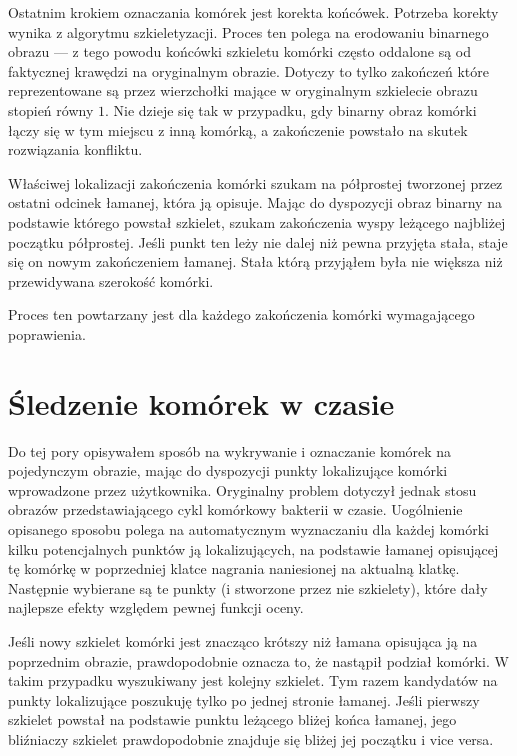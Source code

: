 \documentclass[declaration,shortabstract,mgr]{iithesis}
\begin{document}
Ostatnim krokiem oznaczania komórek jest korekta końcówek.
Potrzeba korekty wynika z algorytmu szkieletyzacji.
Proces ten polega na erodowaniu binarnego obrazu --- z tego powodu końcówki szkieletu komórki często oddalone są od faktycznej krawędzi na oryginalnym obrazie.
Dotyczy to tylko zakończeń które reprezentowane są przez wierzchołki mające w oryginalnym szkielecie obrazu stopień równy $1$.
Nie dzieje się tak w przypadku, gdy binarny obraz komórki łączy się w tym miejscu z inną komórką, a zakończenie powstało na skutek rozwiązania konfliktu.

Właściwej lokalizacji zakończenia komórki szukam na półprostej tworzonej przez ostatni odcinek łamanej, która ją opisuje.
Mając do dyspozycji obraz binarny na podstawie którego powstał szkielet, szukam zakończenia wyspy leżącego najbliżej początku półprostej.
Jeśli punkt ten leży nie dalej niż pewna przyjęta stała, staje się on nowym zakończeniem łamanej.
Stała którą przyjąłem była nie większa niż przewidywana szerokość komórki.

Proces ten powtarzany jest dla każdego zakończenia komórki wymagającego poprawienia.

\section{Śledzenie komórek w czasie}
\label{sec:cell-tracking}

Do tej pory opisywałem sposób na wykrywanie i oznaczanie komórek na pojedynczym obrazie, mając do dyspozycji punkty lokalizujące komórki wprowadzone przez użytkownika.
Oryginalny problem dotyczył jednak stosu obrazów przedstawiającego cykl komórkowy bakterii w czasie.
Uogólnienie opisanego sposobu polega na automatycznym wyznaczaniu dla każdej komórki kilku potencjalnych punktów ją lokalizujących, na podstawie łamanej opisującej tę komórkę w poprzedniej klatce nagrania naniesionej na aktualną klatkę.
Następnie wybierane są te punkty (i stworzone przez nie szkielety), które dały najlepsze efekty względem pewnej funkcji oceny.

Jeśli nowy szkielet komórki jest znacząco krótszy niż łamana opisująca ją na poprzednim obrazie, prawdopodobnie oznacza to, że nastąpił podział komórki. W takim przypadku wyszukiwany jest kolejny szkielet. Tym razem kandydatów na punkty lokalizujące poszukuję tylko po jednej stronie łamanej. Jeśli pierwszy szkielet powstał na podstawie punktu leżącego bliżej końca łamanej, jego bliźniaczy szkielet prawdopodobnie znajduje się bliżej jej początku i vice versa.
\end{document}
